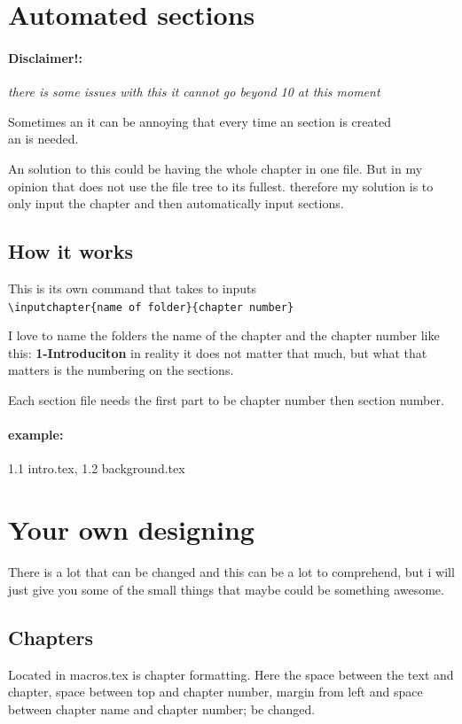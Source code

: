 \section{Automated sections}
\paragraph{Disclaimer!:}\textit{there is some issues with this it cannot go beyond 10 at this moment}

Sometimes an it can be annoying that every time an section is created \\
an \verb|| is needed. 

An solution to this could be having the whole chapter in one file. 
But in my opinion that does not use the file tree to its fullest.
therefore my solution is to only input the chapter and then automatically input sections.

\subsection{How it works}
This is its own command that takes to inputs \\ 
\verb|\inputchapter{name of folder}{chapter number}|

I love to name the folders the name of the chapter and the chapter number like this: 
\textbf{1-Introduciton} in reality it does not matter that much, but what that matters is the numbering on the sections.

Each section file needs the first part to be chapter number then section number.
\paragraph{example:} 1.1 intro.tex, 1.2 background.tex


\section{Your own designing}
There is a lot that can be changed and this can be a lot to comprehend, but i will just give you some of the small things that maybe could be something awesome. 

\subsection{Chapters}
Located in macros.tex is chapter formatting. Here the space between the text and chapter, space between top and chapter number, margin from left and space between chapter name and chapter number; be changed.
